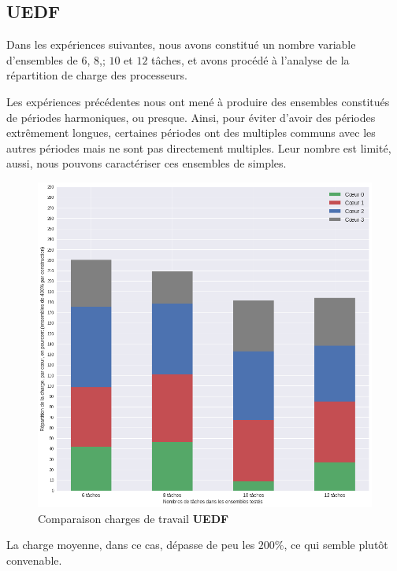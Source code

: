 	\subsection{UEDF}
	Dans les expériences suivantes, nous avons constitué un nombre variable d'ensembles de $6$, $8$,; $10$ et $12$ tâches, 
	et avons procédé à l'analyse de la répartition de charge des processeurs.\newline
	
	Les expériences précédentes nous ont mené à produire des ensembles constitués de 
	périodes harmoniques, ou \og{}presque\fg{}. Ainsi, pour éviter d'avoir des 
	périodes extrêmement longues, certaines périodes ont des multiples communs 
	avec les autres périodes mais ne sont pas directement multiples. Leur nombre est limité, aussi, nous pouvons 
	caractériser ces ensembles de \og{}simples\fg{}.\newline

	\begin{figure}[H]
		\label{loadevolution}
		\caption{Comparaison charges de travail \textbf{UEDF}}
		\includegraphics[scale=0.5]{img/wcet/repartitiondecharges_uedf}
	\end{figure}		
	
	La charge moyenne, dans ce cas, dépasse de peu les $200\%$, ce qui semble plutôt convenable. 
	
